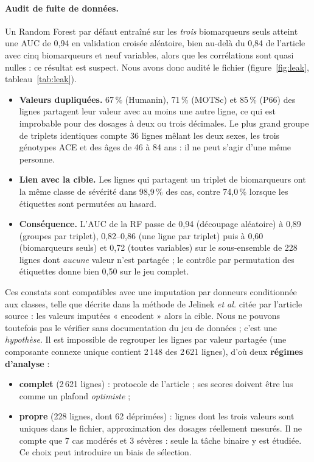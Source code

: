 \paragraph{Audit de fuite de données.} Un Random Forest par défaut entraîné sur les \emph{trois} biomarqueurs seuls atteint une AUC de 0,94 en validation croisée aléatoire, bien au-delà du 0,84 de l'article avec cinq biomarqueurs et neuf variables, alors que les corrélations sont quasi nulles : ce résultat est suspect. Nous avons donc audité le fichier (figure~\ref{fig:leak}, tableau~\ref{tab:leak}).
\begin{itemize}[leftmargin=*,itemsep=0pt,topsep=2pt]
\item \textbf{Valeurs dupliquées.} 67\,\% (Humanin), 71\,\% (MOTSc) et 85\,\% (P66) des lignes partagent leur valeur avec au moins une autre ligne, ce qui est improbable pour des dosages à deux ou trois décimales. Le plus grand groupe de triplets identiques compte 36 lignes mêlant les deux sexes, les trois génotypes ACE et des âges de 46 à 84 ans : il ne peut s'agir d'une même personne.
\item \textbf{Lien avec la cible.} Les lignes qui partagent un triplet de biomarqueurs ont la même classe de sévérité dans 98,9\,\% des cas, contre 74,0\,\% lorsque les étiquettes sont permutées au hasard.
\item \textbf{Conséquence.} L'AUC de la RF passe de 0,94 (découpage aléatoire) à 0,89 (groupes par triplet), 0,82--0,86 (une ligne par triplet) puis à 0,60 (biomarqueurs seuls) et 0,72 (toutes variables) sur le sous-ensemble de 228 lignes dont \emph{aucune} valeur n'est partagée ; le contrôle par permutation des étiquettes donne bien 0,50 sur le jeu complet.
\end{itemize}
Ces constats sont compatibles avec une imputation par donneurs conditionnée aux classes, telle que décrite dans la méthode de Jelinek \emph{et al.} \cite{jelinek2014} citée par l'article source : les valeurs imputées « encodent » alors la cible. Nous ne pouvons toutefois pas le vérifier sans documentation du jeu de données ; c'est une \emph{hypothèse}. Il est impossible de regrouper les lignes par valeur partagée (une composante connexe unique contient 2\,148 des 2\,621 lignes), d'où deux \textbf{régimes d'analyse} :
\begin{itemize}[leftmargin=*,itemsep=0pt,topsep=2pt]
\item \textbf{complet} (2\,621 lignes) : protocole de l'article ; ses scores doivent être lus comme un plafond \emph{optimiste} ;
\item \textbf{propre} (228 lignes, dont 62 déprimées) : lignes dont les trois valeurs sont uniques dans le fichier, approximation des dosages réellement mesurés. Il ne compte que 7 cas modérés et 3 sévères : seule la tâche binaire y est étudiée. Ce choix peut introduire un biais de sélection.
\end{itemize}

